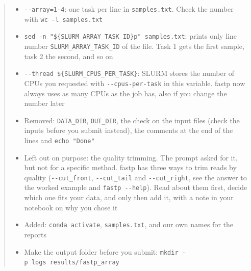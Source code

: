 \documentclass[
  letterpaper,
  DIV=11,
  numbers=noendperiod]{scrreprt}
\newenvironment{Shaded}{}{}
\newcommand{\AttributeTok}[1]{\textcolor[rgb]{0.84,0.23,0.29}{#1}}
\newcommand{\DataTypeTok}[1]{\textcolor[rgb]{0.84,0.23,0.29}{#1}}
\newcommand{\ExtensionTok}[1]{\textcolor[rgb]{0.84,0.23,0.29}{\textbf{#1}}}
\newcommand{\NormalTok}[1]{\textcolor[rgb]{0.14,0.16,0.18}{#1}}
\newcommand{\PreprocessorTok}[1]{\textcolor[rgb]{0.84,0.23,0.29}{#1}}
\newcommand{\VariableTok}[1]{\textcolor[rgb]{0.89,0.38,0.04}{#1}}
\providecommand{\tightlist}{%
  \setlength{\itemsep}{0pt}\setlength{\parskip}{0pt}}
\begin{document}
\begin{tcolorbox}
\begin{quote}
\begin{Shaded}
\end{Shaded}

\begin{itemize}
\tightlist
\item
  \texttt{-\/-array=1-4}: one task per line in \texttt{samples.txt}.
  Check the number with \texttt{wc\ -l\ samples.txt}
\item
  \texttt{sed\ -n\ "\$\{SLURM\_ARRAY\_TASK\_ID\}p"\ samples.txt}: prints
  only line number \texttt{SLURM\_ARRAY\_TASK\_ID} of the file. Task 1
  gets the first sample, task 2 the second, and so on
\item
  \texttt{-\/-thread\ \$\{SLURM\_CPUS\_PER\_TASK\}}: SLURM stores the
  number of CPUs you requested with \texttt{-\/-cpus-per-task} in this
  variable. fastp now always uses as many CPUs as the job has, also if
  you change the number later
\item
  Removed: \texttt{DATA\_DIR}, \texttt{OUT\_DIR}, the check on the input
  files (check the inputs before you submit instead), the comments at
  the end of the lines and \texttt{echo\ "Done"}
\item
  Left out on purpose: the quality trimming. The prompt asked for it,
  but not for a specific method. fastp has three ways to trim reads by
  quality (\texttt{-\/-cut\_front}, \texttt{-\/-cut\_tail} and
  \texttt{-\/-cut\_right}, see the answer to the worked example and
  \texttt{fastp\ -\/-help}). Read about them first, decide which one
  fits your data, and only then add it, with a note in your notebook on
  why you chose it
\item
  Added: \texttt{conda\ activate}, \texttt{samples.txt}, and our own
  names for the reports
\item
  Make the output folder before you submit:
  \texttt{mkdir\ -p\ logs\ results/fastp\_array}
\end{itemize}


\end{quote}
\end{tcolorbox}
\end{document}
